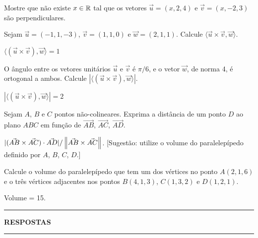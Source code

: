 \documentclass[12pt]{exam}
\begin{document}

\begin{exercicio}
    Mostre que não existe $x \in \mathbb{R}$ tal que os vetores $\vec{u} = (x,2,4)$ e $\vec{v} = (x,-2,3)$ são perpendiculares.
\end{exercicio}

\begin{exercicio}
    Sejam $\vec{u} = (-1,1,-3)$, $\vec{v} = (1,1,0)$ e $\vec{w} = (2,1,1)$. Calcule $\langle\vec{u}\times\vec{v}, \vec{w}\rangle$.
    \begin{solucao}
        $\langle(\vec{u}\times\vec{v}), \vec{w}\rangle = 1$
    \end{solucao}
\end{exercicio}

\begin{exercicio}
    O ângulo entre os vetores unitários $\vec{u}$ e $\vec{v}$ é $\pi/6$, e o vetor $\vec{w}$, de norma 4, é ortogonal a ambos. Calcule
    $|\langle(\vec{u}\times\vec{v}), \vec{w}\rangle|$.
    \begin{solucao}
        $|\langle(\vec{u}\times\vec{v}), \vec{w}\rangle| = 2$
    \end{solucao}
\end{exercicio}

\begin{exercicio}
    Sejam $A$, $B$ e $C$ pontos não-colineares. Exprima a distância de um ponto $D$ ao plano $ABC$ em função de $\vec{AB}$, $\vec{AC}$, $\vec{AD}$.
    \begin{solucao}
        $|(\vec{AB}\times\vec{AC})\cdot\vec{AD}|/\left\Vert{\vec{AB}\times\vec{AC}}\right\Vert$. [Sugestão: utilize o volume do paralelepípedo definido por $A$, $B$, $C$, $D$.]
    \end{solucao}
\end{exercicio}

\begin{exercicio}
    Calcule o volume do paralelepípedo que tem um dos vértices no ponto $A(2,1,6)$ e o três vértices adjacentes nos pontos $B(4,1,3)$, $C(1,3,2)$ e $D(1,2,1)$.
    \begin{solucao}
        Volume = 15.
    \end{solucao}
\end{exercicio}
\newpage
{}
\hrule
\begin{center}
    {\large\bf RESPOSTAS}
\end{center}
\hrule

\end{document}
